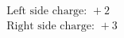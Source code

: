 \documentclass[preview]{standalone}
\begin{document}
\begin{align*}
\text{Left side charge: } +2 \\ \text{Right side charge: } +3
\end{align*}
\end{document}
